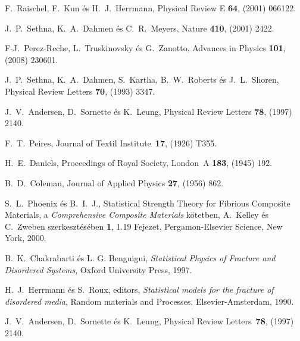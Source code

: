 \begin{thebibliography}{200}
\vspace*{-0.3cm}
 F.\ Raischel, F.\ Kun \'es H.\ J.\ Herrmann, Physical Review E {\bf64}, (2001) 066122.

\vspace*{-0.3cm}
 J.\ P.\ Sethna, K.\ A.\ Dahmen \'es C.\ R.\ Meyers, Nature {\bf410}, (2001) 2422.

\vspace*{-0.3cm}
 F-J.\ Perez-Reche, L.\ Truskinovsky \'es G.\ Zanotto, Advances in Physics {\bf101}, (2008) 230601.

\vspace*{-0.3cm}
 J.\ P.\ Sethna, K.\ A.\ Dahmen, S.\ Kartha, B.\ W.\ Roberts \'es J.\ L.\ Shoren, Physical Review Letters {\bf70}, (1993) 3347.

\vspace*{-0.3cm}
 J.\ V.\ Andersen, D.\ Sornette \'es K.\ Leung, Physical Review Letters {\bf78}, (1997) 2140.



\vspace*{-0.3cm}
 F.\ T.\ Peires, Journal of Textil Institute\ {\bf 17}, (1926) T355.

\vspace*{-0.3cm}
 H.\ E.\ Daniels, Proceedings of Royal Society, London\ A {\bf 183}, (1945) 192.

\vspace*{-0.3cm}
 B.\ D.\ Coleman, Journal of Applied Physics {\bf 27}, (1956) 862.

\vspace*{-0.3cm}
 S.\ L.\ Phoenix \'es B.\ I.\ J., Statistical Strength Theory for Fibrious Composite Materials, a {\it Comprehensive Composite Materials} k\"{o}tetben, A.\ Kelley \'es C.\ Zweben szerkeszt\'es\'eben {\bf 1}, 1.19 Fejezet, Pergamon-Elsevier Science, New York, 2000.

\vspace*{-0.3cm}
 B.\ K.\ Chakrabarti \'es L. G. Benguigui, {\it Statistical Physics of Fracture and Disordered Systems}, Oxford University Press, 1997.

\vspace*{-0.3cm}
 H.\ J.\ Herrmann \'es S.\ Roux, editors, {\it Statistical models for the fracture of disordered media}, Random materials and Processes, Elsevier-Amsterdam, 1990.

\vspace*{-0.3cm}
 J.\ V.\ Andersen, D.\ Sornette \'es K.\ Leung, Physical Review Letters\ {\bf 78}, (1997) 2140.


\end{thebibliography}
